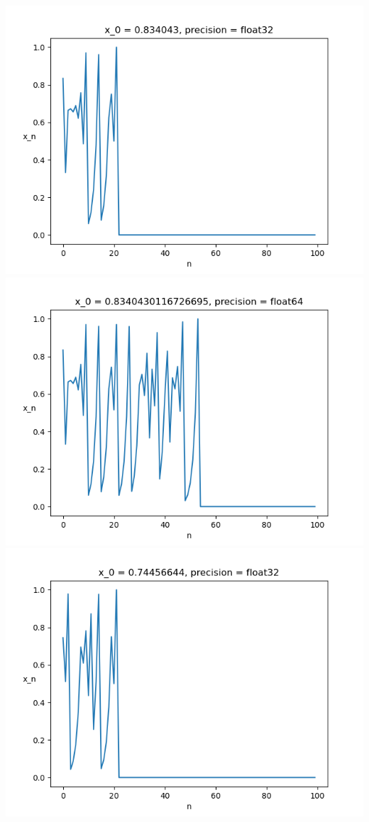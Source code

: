 \documentclass{article}
\begin{document}
\begin{enumerate}
\begin{enumerate}
		\begin{center}
			\includegraphics[scale=.4]{hw1 run = 0, precision = float32}
			\includegraphics[scale=.4]{hw1 run = 0, precision = float64}
			\includegraphics[scale=.4]{hw1 run = 1, precision = float32}

\end{center}
\end{enumerate}
\end{enumerate}
\end{document}
